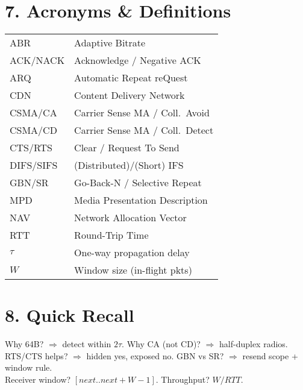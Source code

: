 \documentclass[10pt]{article}
\begin{document}
\begin{multicols*}{2}
\section*{7. Acronyms \& Definitions}
\begin{tabular}{@{}p{1.2cm}p{3.5cm}@{}}
ABR & Adaptive Bitrate\\
ACK/NACK & Acknowledge / Negative ACK\\
ARQ & Automatic Repeat reQuest\\
CDN & Content Delivery Network\\
CSMA/CA & Carrier Sense MA / Coll.\ Avoid\\
CSMA/CD & Carrier Sense MA / Coll.\ Detect\\
CTS/RTS & Clear / Request To Send\\
DIFS/SIFS & (Distributed)/(Short) IFS\\
GBN/SR & Go-Back-N / Selective Repeat\\
MPD & Media Presentation Description\\
NAV & Network Allocation Vector\\
RTT & Round-Trip Time\\
$\tau$ & One-way propagation delay\\
$W$ & Window size (in-flight pkts)\\
\end{tabular}

\section*{8. Quick Recall}
Why 64B? $\Rightarrow$ detect within $2\tau$. \quad
Why CA (not CD)? $\Rightarrow$ half-duplex radios.\\
RTS/CTS helps? $\Rightarrow$ hidden yes, exposed no. \quad
GBN vs SR? $\Rightarrow$ resend scope + window rule.\\
Receiver window? $[next..next+W-1]$. \quad
Throughput? $W/RTT$.

\end{multicols*}
\end{document}
